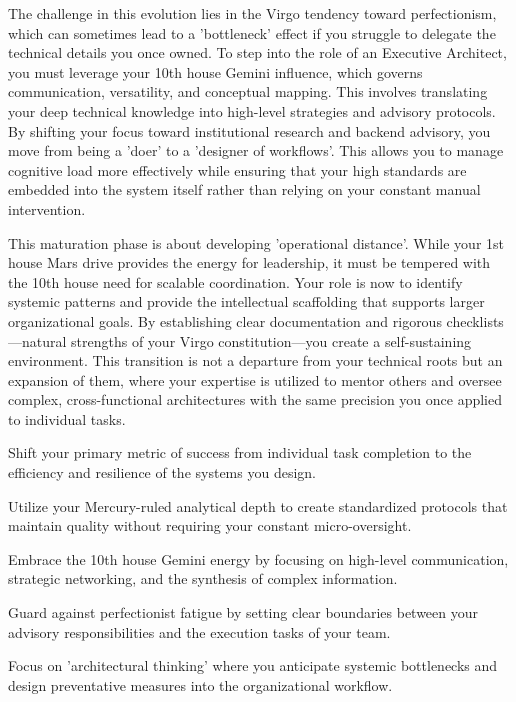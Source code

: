 {\fontsize{9}{13}\selectfont The challenge in this evolution lies in the Virgo tendency toward perfectionism, which can sometimes lead to a 'bottleneck' effect if you struggle to delegate the technical details you once owned. To step into the role of an Executive Architect, you must leverage your 10th house Gemini influence, which governs communication, versatility, and conceptual mapping. This involves translating your deep technical knowledge into high-level strategies and advisory protocols. By shifting your focus toward institutional research and backend advisory, you move from being a 'doer' to a 'designer of workflows'. This allows you to manage cognitive load more effectively while ensuring that your high standards are embedded into the system itself rather than relying on your constant manual intervention.}\par\vspace{1.8mm}

{\fontsize{9}{13}\selectfont This maturation phase is about developing 'operational distance'. While your 1st house Mars drive provides the energy for leadership, it must be tempered with the 10th house need for scalable coordination. Your role is now to identify systemic patterns and provide the intellectual scaffolding that supports larger organizational goals. By establishing clear documentation and rigorous checklists---natural strengths of your Virgo constitution---you create a self-sustaining environment. This transition is not a departure from your technical roots but an expansion of them, where your expertise is utilized to mentor others and oversee complex, cross-functional architectures with the same precision you once applied to individual tasks.}\par\vspace{1.8mm}

\begin{diamondlist}
  \item {\fontsize{8.5}{12}\selectfont Shift your primary metric of success from individual task completion to the efficiency and resilience of the systems you design.}
  \item {\fontsize{8.5}{12}\selectfont Utilize your Mercury-ruled analytical depth to create standardized protocols that maintain quality without requiring your constant micro-oversight.}
  \item {\fontsize{8.5}{12}\selectfont Embrace the 10th house Gemini energy by focusing on high-level communication, strategic networking, and the synthesis of complex information.}
  \item {\fontsize{8.5}{12}\selectfont Guard against perfectionist fatigue by setting clear boundaries between your advisory responsibilities and the execution tasks of your team.}
  \item {\fontsize{8.5}{12}\selectfont Focus on 'architectural thinking' where you anticipate systemic bottlenecks and design preventative measures into the organizational workflow.}
\end{diamondlist}

